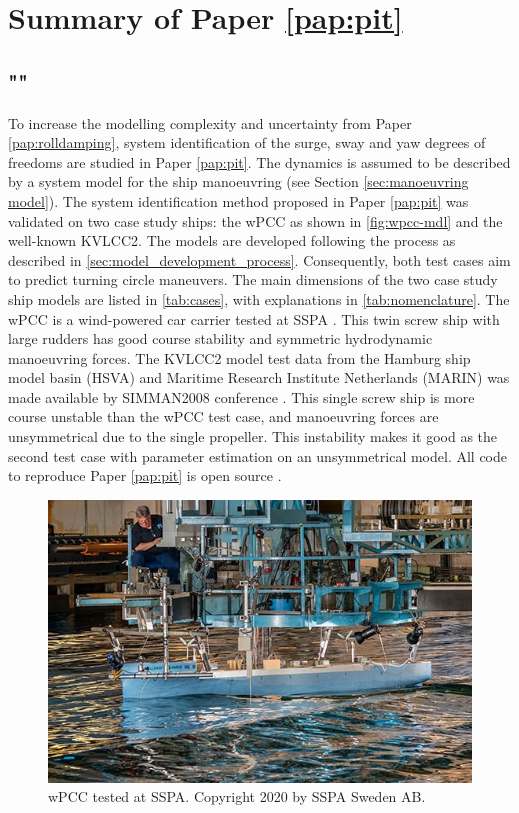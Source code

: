 \section{Summary of Paper \ref{pap:pit}}
\subsection*{""}
To increase the modelling complexity and uncertainty from Paper \ref{pap:rolldamping}, system identification of the surge, sway and yaw
degrees of freedoms are studied in Paper \ref{pap:pit}. The dynamics is assumed to be described by a system model for the ship manoeuvring (see Section \ref{sec:manoeuvring model}). The system identification method proposed in Paper \ref{pap:pit} was validated on two case study ships: the wPCC as shown in \autoref{fig:wpcc-mdl} and the well-known KVLCC2. The models are developed following the process as described in \autoref{sec:model_development_process}. Consequently, both test cases aim to predict turning circle maneuvers. The main dimensions of the two case study ship models are listed in \autoref{tab:cases}, with explanations in \autoref{tab:nomenclature}. The wPCC is a wind-powered car carrier tested at SSPA \cite{alexandersson_wpcc_2022}. This twin screw ship with large rudders has good course stability and symmetric hydrodynamic manoeuvring forces. The KVLCC2 model test data from the Hamburg ship model basin (HSVA) and Maritime Research Institute Netherlands (MARIN) was made available by SIMMAN2008 conference \cite{stern_experience_2011}. This single screw ship is more course unstable than the wPCC test case, and manoeuvring forces are unsymmetrical due to the single propeller. This instability makes it good as the second test case with parameter estimation on an unsymmetrical model. All code to reproduce Paper \ref{pap:pit} is open source \cite{alexandersson_code_2022}.

\begin{figure}[!htb]
\centering
\includegraphics[width=\linewidth]{kappa/images/wpcc_mdl.png}
\caption{wPCC tested at SSPA. Copyright 2020 by SSPA Sweden AB.}
\label{fig:wpcc-mdl}
\end{figure}



